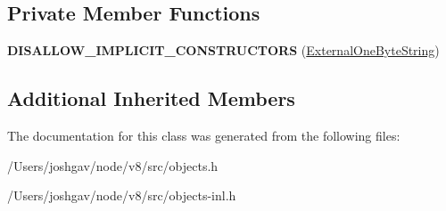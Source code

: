 \subsection*{Private Member Functions}
\begin{DoxyCompactItemize}
\item 
{\bfseries D\+I\+S\+A\+L\+L\+O\+W\+\_\+\+I\+M\+P\+L\+I\+C\+I\+T\+\_\+\+C\+O\+N\+S\+T\+R\+U\+C\+T\+O\+RS} (\hyperlink{classv8_1_1internal_1_1_external_one_byte_string}{External\+One\+Byte\+String})\hypertarget{classv8_1_1internal_1_1_external_one_byte_string_ab1d8047f39df1fb75611b9d369a2c1a9}{}\label{classv8_1_1internal_1_1_external_one_byte_string_ab1d8047f39df1fb75611b9d369a2c1a9}

\end{DoxyCompactItemize}
\subsection*{Additional Inherited Members}


The documentation for this class was generated from the following files\+:\begin{DoxyCompactItemize}
\item 
/\+Users/joshgav/node/v8/src/objects.\+h\item 
/\+Users/joshgav/node/v8/src/objects-\/inl.\+h\end{DoxyCompactItemize}
